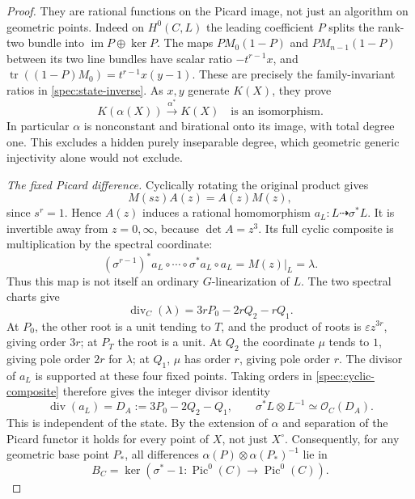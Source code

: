 \begin{proof}
They are rational functions on the Picard image, not just an
algorithm on geometric points.  Indeed on $H^0(C,L)$ the leading
coefficient $P$ splits the rank-two bundle into
$\operatorname{im}P\oplus\ker P$.
The maps $PM_0(1-P)$ and $PM_{n-1}(1-P)$ between its two line
bundles have scalar ratio $-t^{r-1}x$, and
$\operatorname{tr}((1-P)M_0)=t^{r-1}x(y-1)$.
These are precisely the family-invariant ratios in
\eqref{spec:state-inverse}.  As $x,y$ generate $K(X)$, they prove
\begin{equation}
K(\alpha(X))\xrightarrow{\alpha^*}K(X)
\quad\text{is an isomorphism}.
\label{spec:function-field-inverse}
\end{equation}
In particular $\alpha$ is nonconstant and birational onto its image,
with total degree one.  This excludes a hidden purely inseparable
degree, which geometric generic injectivity alone would not exclude.

\emph{The fixed Picard difference.}
Cyclically rotating the original product gives
\[
M(sz)A(z)=A(z)M(z),
\]
since $s^r=1$.
Hence $A(z)$ induces a rational homomorphism
$a_L:L\dashrightarrow\sigma^*L$.
It is invertible away from $z=0,\infty$, because $\det A=z^3$.
Its full cyclic composite is multiplication by the spectral
coordinate:
\begin{equation}
(\sigma^{r-1})^*a_L\circ\cdots\circ\sigma^*a_L\circ a_L
=M(z)|_L=\lambda.
\label{spec:cyclic-composite}
\end{equation}
Thus this map is not itself an ordinary $G$-linearization of $L$.
The two spectral charts give
\[
\operatorname{div}_C(\lambda)=3rP_0-2rQ_2-rQ_1.
\]
At $P_0$, the other root is a unit tending to $T$, and the product
of roots is $\varepsilon z^{3r}$, giving order $3r$; at $P_T$ the
root is a unit.  At $Q_2$ the coordinate $\mu$ tends to $1$, giving
pole order $2r$ for $\lambda$; at $Q_1$, $\mu$ has order $r$,
giving pole order $r$.  The divisor of $a_L$ is supported at these
four fixed points.  Taking orders in \eqref{spec:cyclic-composite}
therefore gives the integer divisor identity
\begin{equation}
\operatorname{div}(a_L)=D_A:=3P_0-2Q_2-Q_1,
\qquad \sigma^*L\otimes L^{-1}\simeq\mathcal O_C(D_A).
\label{spec:fixed-difference}
\end{equation}
This is independent of the state.  By the extension of $\alpha$
and separation of the Picard functor it holds for every point of
$X$, not just $X^\circ$.  Consequently, for any geometric base
point $P_*$, all differences
$\alpha(P)\otimes\alpha(P_*)^{-1}$ lie in
\[
B_C=\ker(\sigma^*-1:\operatorname{Pic}^0(C)\to
                              \operatorname{Pic}^0(C)).
\]


\end{proof}
